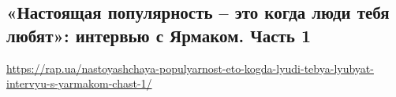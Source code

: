  
 


\subsection{«Настоящая популярность – это когда люди тебя любят»: интервью с Ярмаком. Часть 1}

\url{https://rap.ua/nastoyashchaya-populyarnost-eto-kogda-lyudi-tebya-lyubyat-intervyu-s-yarmakom-chast-1/}

